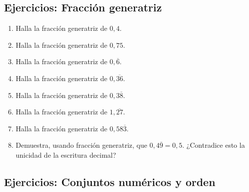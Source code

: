 \documentclass[12pt, letterpaper]{article}
\begin{document}
\subsection{Ejercicios: Fracción generatriz}

\begin{enumerate}[leftmargin=*, resume]
  \item \facil{} Halla la fracción generatriz de $0{,}4$.

  \item \facil{} Halla la fracción generatriz de $0{,}75$.

  \item \facil{} Halla la fracción generatriz de $0{,}\overline{6}$.

  \item \medio{} Halla la fracción generatriz de $0{,}\overline{36}$.

  \item \medio{} Halla la fracción generatriz de $0{,}3\overline{8}$.

  \item \medio{} Halla la fracción generatriz de $1{,}\overline{27}$.

  \item \medio{} Halla la fracción generatriz de $0{,}58\overline{3}$.

  \item \dificil{} Demuestra, usando fracción generatriz, que $0{,}4\overline{9} = 0{,}5$. ¿Contradice esto la unicidad de la escritura decimal?
\end{enumerate}

\subsection{Ejercicios: Conjuntos numéricos y orden}
\end{document}
